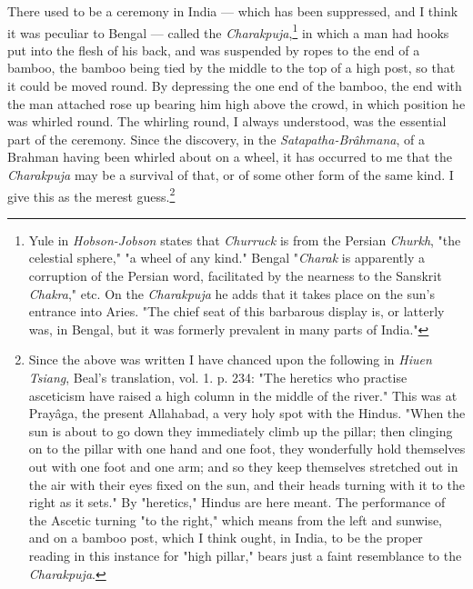 \documentclass[a4paper, 11pt, oneside, polutonikogreek, english]{article}
\begin{document}
There used to be a ceremony in India --- which has been suppressed, and I think it was peculiar to Bengal --- called the \emph{Charakpuja},\footnote{Yule in \emph{Hobson-Jobson} states that \emph{Churruck} is from the Persian \emph{Churkh}, "the celestial sphere," "a wheel of any kind." Bengal "\emph{Charak} is apparently a corruption of the Persian word, facilitated by the nearness to the Sanskrit \emph{Chakra}," etc. On the \emph{Charakpuja} he adds that it takes place on the sun's entrance into Aries. "The chief seat of this barbarous display is, or latterly was, in Bengal, but it was formerly prevalent in many parts of India."} in which a man had hooks put into the flesh of his back, and was suspended by ropes to the end of a bamboo, the bamboo being tied by the middle to the top of a high post, so that it could be moved round. By depressing the one end of the bamboo, the end with the man attached rose up bearing him high above the crowd, in which position he was whirled round. The whirling round, I always understood, was the essential part of the ceremony. Since the discovery, in the \emph{Satapatha-Brâhmana}, of a Brahman having been whirled about on a wheel, it has occurred to me that the \emph{Charakpuja} may be a survival of that, or of some other form of the same kind. I give this as the merest guess.\footnote{Since the above was written I have chanced upon the following in \emph{Hiuen Tsiang}, Beal's translation, vol. 1. p. 234: "The heretics who practise asceticism have raised a high column in the middle of the river." This was at Prayâga, the present Allahabad, a very holy spot with the Hindus. "When the sun is about to go down they immediately climb up the pillar; then clinging on to the pillar with one hand and one foot, they wonderfully hold themselves out with one foot and one arm; and so they keep themselves stretched out in the air with their eyes fixed on the sun, and their heads turning with it to the right as it sets." By "heretics," Hindus are here meant. The performance of the Ascetic turning "to the right," which means from the left and sunwise, and on a bamboo post, which I think ought, in India, to be the proper reading in this instance for "high pillar," bears just a faint resemblance to the \emph{Charakpuja}.}
\end{document}
